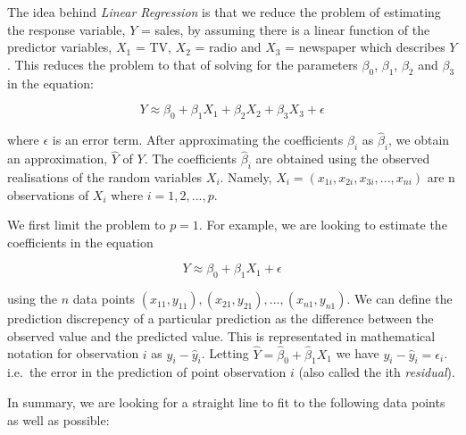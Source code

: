 \documentclass[11pt]{article}
\begin{document}
The idea behind \emph{Linear Regression} is that we reduce the problem
of estimating the response variable, \(Y\) = sales, by assuming there is
a linear function of the predictor variables, \(X_1\) = TV, \(X_2\) =
radio and \(X_3\) = newspaper which describes \(Y\). This reduces the
problem to that of solving for the parameters \(\beta_0\), \(\beta_1\),
\(\beta_2\) and \(\beta_3\) in the equation:

\[Y \approx \beta_0 + \beta_1 X_1 + \beta_2 X_2 + \beta_3 X_3 + \epsilon\]

where \(\epsilon\) is an error term. After approximating the
coefficients \(\beta_i\) as \(\hat{\beta}_i\), we obtain an
approximation, \(\hat{Y}\) of \(Y\). The coefficients \(\hat{\beta}_i\)
are obtained using the observed realisations of the random variables
\(X_i\). Namely, \(X_i = (x_{1i},x_{2i},x_{3i},...,x_{ni})\) are n
observations of \(X_i\) where \(i = 1,2,...,p\).

We first limit the problem to \(p=1\). For example, we are looking to
estimate the coefficients in the equation

\[Y \approx \beta_0 + \beta_1 X_1 + \epsilon\]

using the \(n\) data points
\((x_{11},y_{11}),(x_{21},y_{21}),...,(x_{n1},y_{n1})\). We can define
the prediction discrepency of a particular prediction as the difference
between the observed value and the predicted value. This is
representated in mathematical notation for observation \(i\) as
\(y_i - \hat{y}_i\). Letting
\(\hat{Y} = \hat{\beta}_0 + \hat{\beta}_1 X_1\) we have
\(y_i - \hat{y}_i = \epsilon_i\). i.e.~the error in the prediction of
point observation \(i\) (also called the ith \emph{residual}).

In summary, we are looking for a straight line to fit to the following
data points as well as possible:
\end{document}
